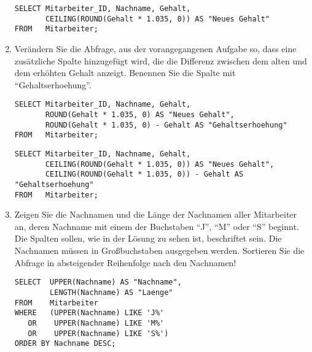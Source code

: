 \begin{enumerate}
        \begin{mssql}[\FALSE]
        \end{mssql}
        \begin{lstlisting}[language=ms_sql]
SELECT Mitarbeiter_ID, Nachname, Gehalt,
       CEILING(ROUND(Gehalt * 1.035, 0)) AS "Neues Gehalt"
FROM   Mitarbeiter;
        \end{lstlisting}
        \item Verändern Sie die Abfrage, aus der vorangegangenen Aufgabe so,
        dass eine zusätzliche Spalte hinzugefügt wird, die die Differenz
        zwischen dem alten und dem erhöhten Gehalt anzeigt. Benennen Sie die
        Spalte mit \enquote{Gehaltserhoehung}.
        \begin{oraclesql}[\FALSE]
        \end{oraclesql}
        \begin{lstlisting}[language=oracle_sql]
SELECT Mitarbeiter_ID, Nachname, Gehalt,
       ROUND(Gehalt * 1.035, 0) AS "Neues Gehalt",
       ROUND(Gehalt * 1.035, 0) - Gehalt AS "Gehaltserhoehung"
FROM   Mitarbeiter;
        \end{lstlisting}
\clearpage
        \begin{mssql}[\FALSE]
        \end{mssql}
        \begin{lstlisting}[language=ms_sql]
SELECT Mitarbeiter_ID, Nachname, Gehalt,
       CEILING(ROUND(Gehalt * 1.035, 0)) AS "Neues Gehalt",
       CEILING(ROUND(Gehalt * 1.035, 0)) - Gehalt AS "Gehaltserhoehung"
FROM   Mitarbeiter;
        \end{lstlisting}
        \item Zeigen Sie die Nachnamen und die Länge der Nachnamen aller
        Mitarbeiter an, deren Nachname mit einem der Buchstaben \enquote{J},
        \enquote{M} oder \enquote{S} beginnt. Die Spalten sollen, wie in der
        Lösung zu sehen ist, beschriftet sein. Die Nachnamen müssen in
        Großbuchstaben ausgegeben werden. Sortieren Sie die Abfrage in
        absteigender Reihenfolge nach den Nachnamen! 
        \begin{oraclesql}[\FALSE]
        \end{oraclesql}
        \begin{lstlisting}[language=oracle_sql]
SELECT  UPPER(Nachname) AS "Nachname",
        LENGTH(Nachname) AS "Laenge"
FROM    Mitarbeiter
WHERE   (UPPER(Nachname) LIKE 'J%'
   OR    UPPER(Nachname) LIKE 'M%'
   OR    UPPER(Nachname) LIKE 'S%')
ORDER BY Nachname DESC;
        \end{lstlisting}

\end{enumerate}

